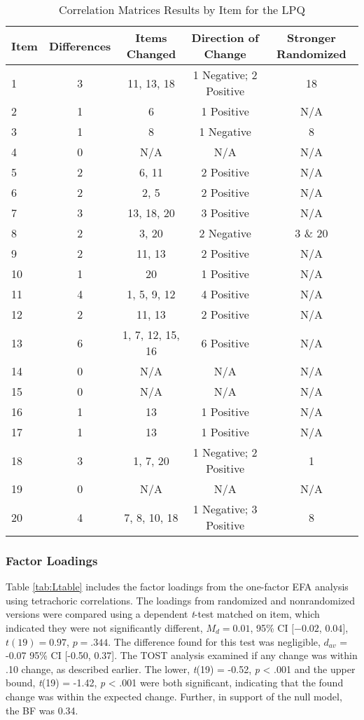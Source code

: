 \documentclass[english,man]{apa6}
\theoremstyle{definition}
\theoremstyle{definition}
\theoremstyle{definition}
\theoremstyle{remark}
\begin{document}
\begin{table}[tbp]
\begin{center}
\begin{threeparttable}
\caption{\label{tab:cor-table-lpq}Correlation Matrices Results by Item for the LPQ}
\small{
\begin{tabular}{lcccc}
\toprule
Item & Differences & Items Changed & Direction of Change & Stronger Randomized\\
\midrule
1 & 3 & 11, 13, 18 & 1 Negative; 2 Positive & 18\\
2 & 1 & 6 & 1 Positive & N/A\\
3 & 1 & 8 & 1 Negative & 8\\
4 & 0 & N/A & N/A & N/A\\
5 & 2 & 6, 11 & 2 Positive & N/A\\
6 & 2 & 2, 5 & 2 Positive & N/A\\
7 & 3 & 13, 18, 20 & 3 Positive & N/A\\
8 & 2 & 3, 20 & 2 Negative & 3 \& 20\\
9 & 2 & 11, 13 & 2 Positive & N/A\\
10 & 1 & 20 & 1 Positive & N/A\\
11 & 4 & 1, 5, 9, 12 & 4 Positive & N/A\\
12 & 2 & 11, 13 & 2 Positive & N/A\\
13 & 6 & 1, 7, 12, 15, 16 & 6 Positive & N/A\\
14 & 0 & N/A & N/A & N/A\\
15 & 0 & N/A & N/A & N/A\\
16 & 1 & 13 & 1 Positive & N/A\\
17 & 1 & 13 & 1 Positive & N/A\\
18 & 3 & 1, 7, 20 & 1 Negative; 2 Positive & 1\\
19 & 0 & N/A & N/A & N/A\\
20 & 4 & 7, 8, 10, 18 & 1 Negative; 3 Positive & 8\\
\bottomrule
\end{tabular}
}
\end{threeparttable}
\end{center}
\end{table}

\subsubsection{Factor Loadings}\label{factor-loadings-1}

Table \ref{tab:Ltable} includes the factor loadings from the one-factor
EFA analysis using tetrachoric correlations. The loadings from
randomized and nonrandomized versions were compared using a dependent
\emph{t}-test matched on item, which indicated they were not
significantly different, \(M_d = 0.01\), 95\% CI \([-0.02\), \(0.04]\),
\(t(19) = 0.97\), \(p = .344\). The difference found for this test was
negligible, \(d_{av}\) = -0.07 95\% CI {[}-0.50, 0.37{]}. The TOST
analysis examined if any change was within .10 change, as described
earlier. The lower, \emph{t}(19) = -0.52, \emph{p} \textless{} .001 and
the upper bound, \emph{t}(19) = -1.42, \emph{p} \textless{} .001 were
both significant, indicating that the found change was within the
expected change. Further, in support of the null model, the BF was 0.34.
\end{document}

